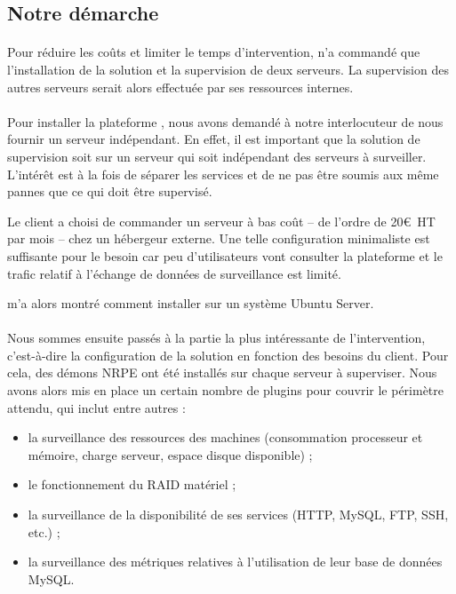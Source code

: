 \subsection{Notre démarche}

\paragraph{}
Pour réduire les coûts et limiter le temps d'intervention, \adacast{} n'a commandé que l'installation de la solution \acentreon{} et la supervision de deux serveurs.
La supervision des autres serveurs serait alors effectuée par ses ressources internes.

\paragraph{}
Pour installer la plateforme \acentreon{}, nous avons demandé à notre interlocuteur de nous fournir un serveur indépendant.
En effet, il est important que la solution de supervision soit sur un serveur qui soit indépendant des serveurs à surveiller.
L'intérêt est à la fois de séparer les services et de ne pas être soumis aux même pannes que ce qui doit être supervisé.

Le client a choisi de commander un serveur à bas coût -- de l'ordre de 20\euro~HT par mois -- chez un hébergeur externe.
Une telle configuration minimaliste est suffisante pour le besoin car peu d'utilisateurs vont consulter la plateforme \acentreon{} et le trafic relatif à l'échange de données de surveillance est limité.

\asegir{} m'a alors montré comment installer \acentreon{} sur un système \alinux{} Ubuntu Server.

\paragraph{}
Nous sommes ensuite passés à la partie la plus intéressante de l'intervention, c'est-à-dire la configuration de la solution en fonction des besoins du client.
Pour cela, des démons NRPE ont été installés sur chaque serveur à superviser.
Nous avons alors mis en place un certain nombre de plugins pour couvrir le périmètre attendu, qui inclut entre autres :

\begin{itemize}
	\item la surveillance des ressources des machines (consommation processeur et mémoire, charge serveur, espace disque disponible) ;
	\item le fonctionnement du RAID matériel ;
	\item la surveillance de la disponibilité de ses services (HTTP, MySQL, FTP, SSH, etc.) ;
	\item la surveillance des métriques relatives à l'utilisation de leur base de données MySQL.
\end{itemize}


